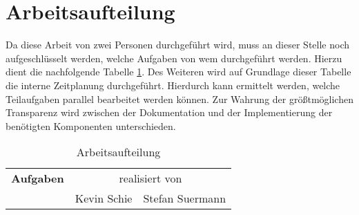\section{Arbeitsaufteilung}
\label{sec:Arbeitsaufteilung}
Da diese Arbeit von zwei Personen durchgeführt wird, muss an dieser Stelle noch aufgeschlüsselt werden, welche Aufgaben von wem durchgeführt werden. Hierzu dient die nachfolgende Tabelle \ref{tbl:arbeitsaufteilung}. Des Weiteren wird auf Grundlage dieser Tabelle die interne Zeitplanung durchgeführt. Hierdurch kann ermittelt werden, welche Teilaufgaben parallel bearbeitet werden können. Zur Wahrung der größtmöglichen Transparenz wird zwischen der Dokumentation und der Implementierung der benötigten Komponenten unterschieden. 
\begin{table}[]
\caption{Arbeitsaufteilung}
\label{tbl:arbeitsaufteilung}
\begin{tabular}{|l|c|c|}
\hline
{\bf Aufgaben}                                                    & \multicolumn{2}{c|}{realisiert von}                                    \\
                                                                  & \multicolumn{1}{l|}{Kevin Schie} & \multicolumn{1}{l|}{Stefan Suermann} \\


\end{tabular}
\end{table}
